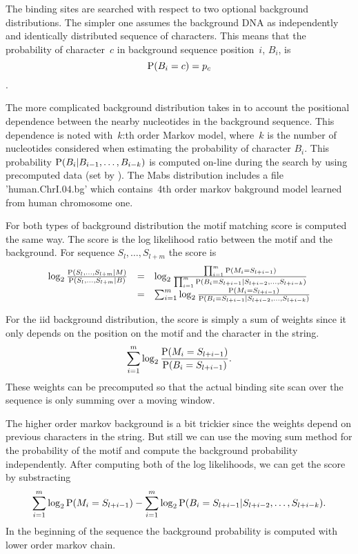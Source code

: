 The binding sites are searched with respect to two optional background
distributions. The simpler one assumes the background DNA as
independently and identically distributed sequence of characters. This
means that the probability of character~$c$ in background sequence
position~$i$, $B_i$, is
\begin{equation}
  \label{eq:bg0markov}
  \mathrm{P}(B_i=c)=p_c
\end{equation}.

The more complicated background distribution takes in to account the
positional dependence between the nearby nucleotides in the background
sequence. This dependence is noted with~$k$:th order Markov model,
where~$k$ is the number of nucleotides considered when estimating the
probability of character $B_i$.  This probability
$\mathrm{P}(B_i|B_{i-1},\ldots,B_{i-k})$ is computed on-line during the
search by using precomputed data (set by ). The
Mabs distribution includes a file 'human.ChrI.04.bg' which
contains~4th order markov bakground model learned from human
chromosome one.

For both types of background distribution the motif matching score is
computed the same way. The score is the log likelihood ratio between
the motif and the background. For sequence $S_l,\ldots,S_{l+m}$ the
score is
\begin{equation}
  \label{eq:bsScore}
  \begin{array}{lll}
  \log_2
  \frac{\mathrm{P}(S_l,\ldots,S_{l+m}|M)}{\mathrm{P}(S_l,\ldots,S_{l+m}|B)} &=& \log_2
  \frac{\prod_{i=1}^{m}\mathrm{P}(M_i=S_{l+i-1})}{\prod_{i=1}^m
    \mathrm{P}(B_i=S_{l+i-1}|S_{l+i-2},\ldots,S_{l+i-k}) }\\
   &= &\sum_{i=1}^{m}\log_2
  \frac{\mathrm{P}(M_i=S_{l+i-1})}{
    \mathrm{P}(B_i=S_{l+i-1}|S_{l+i-2},\ldots,S_{l+i-k}) }
  \end{array}
\end{equation}

For the iid background distribution, the score is simply a sum of
weights since it only depends on the position on the motif and the
character in the string.
\begin{equation}
  \label{eq:bg0markovScore}
\sum_{i=1}^m \log_2
  \frac{\mathrm{P}(M_i=S_{l+i-1})}{\mathrm{P}(B_i=S_{l+i-1})}.
\end{equation}
These weights can be precomputed so that the actual binding site scan
over the sequence is only summing over a moving window.

The higher order markov background is a bit trickier since the weights
depend on previous characters in the string. But still we can use the
moving sum method for the probability of the motif and compute the
background probability independently. After computing both of the log
likelihoods, we can get the score by substracting
\begin{equation}
  \label{eq:markovCounting}
  \sum_{i=1}^{m}\log_2
  \mathrm{P}(M_i=S_{l+i-1}) -  \sum_{i=1}^{m}\log_2
    \mathrm{P}(B_i=S_{l+i-1}|S_{l+i-2},\ldots,S_{l+i-k}).
\end{equation}
In the beginning of the sequence the background probability is
computed with lower order markov chain.


